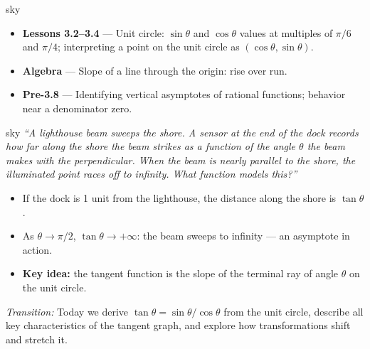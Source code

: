 \documentclass[10pt]{article}
\begin{document}
\begin{skillbox}{sky}
  \begin{itemize}
    \item \textbf{Lessons 3.2--3.4} --- Unit circle: $\sin\theta$ and
          $\cos\theta$ values at multiples of $\pi/6$ and $\pi/4$; interpreting
          a point on the unit circle as $(\cos\theta, \sin\theta)$.
    \item \textbf{Algebra} --- Slope of a line through the origin: rise over run.
    \item \textbf{Pre-3.8} --- Identifying vertical asymptotes of rational
          functions; behavior near a denominator zero.
  \end{itemize}
\end{skillbox}

\begin{skillbox}[Hook]{sky}
  \textit{``A lighthouse beam sweeps the shore. A sensor at the end of the
  dock records how far along the shore the beam strikes as a function of the
  angle $\theta$ the beam makes with the perpendicular. When the beam is
  nearly parallel to the shore, the illuminated point races off to infinity.
  What function models this?''}

  \medskip
  \begin{itemize}
    \item If the dock is 1 unit from the lighthouse, the distance along the
          shore is $\tan\theta$.
    \item As $\theta\to\pi/2$, $\tan\theta\to+\infty$: the beam sweeps to
          infinity --- an asymptote in action.
    \item \textbf{Key idea:} the tangent function is the slope of the terminal
          ray of angle $\theta$ on the unit circle.
  \end{itemize}

  \smallskip
  \textit{Transition:} Today we derive $\tan\theta = \sin\theta/\cos\theta$
  from the unit circle, describe all key characteristics of the tangent graph,
  and explore how transformations shift and stretch it.
\end{skillbox}
\end{document}
